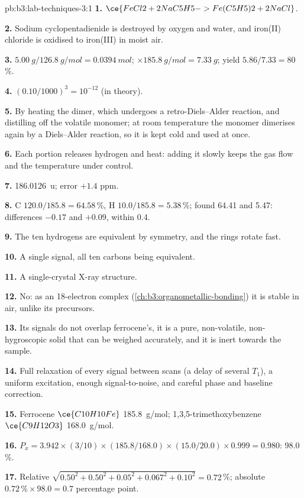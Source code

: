 \begin{solution}{pb:b3:lab-techniques-3:1}
\textbf{1.} $\ce{FeCl2 + 2NaC5H5 -> Fe(C5H5)2 + 2NaCl}$.

\textbf{2.} Sodium cyclopentadienide is destroyed by oxygen and water, and iron(II)
chloride is oxidised to iron(III) in moist air.

\textbf{3.} $\qty{5.00}{g}/\qty{126.8}{g/mol} = \qty{0.0394}{mol}$; $\times \qty{185.8}{g/mol} = \qty{7.33}{g}$; yield $5.86/7.33 = 80$\,\%.

\textbf{4.} $(0.10/1000)^3 = 10^{-12}$ (in theory).

\textbf{5.} By heating the dimer, which undergoes a retro-Diels--Alder reaction, and
distilling off the volatile monomer; at room temperature the monomer dimerises
again by a Diels--Alder reaction, so it is kept cold and used at once.

\textbf{6.} Each portion releases hydrogen and heat: adding it slowly keeps the gas
flow and the temperature under control.

\textbf{7.} \qty{186.0126}{u}; error $+1.4$ ppm.

\textbf{8.} C $120.0/185.8 = 64.58$\,\%, H $10.0/185.8 = 5.38$\,\%; found 64.41 and 5.47: differences $-0.17$ and $+0.09$, within 0.4.

\textbf{9.} The ten hydrogens are equivalent by symmetry, and the rings rotate fast.

\textbf{10.} A single signal, all ten carbons being equivalent.

\textbf{11.} A single-crystal X-ray structure.

\textbf{12.} No: as an 18-electron complex (\cref{ch:b3:organometallic-bonding}) it is stable in air, unlike its
precursors.

\textbf{13.} Its signals do not overlap ferrocene's, it is a pure, non-volatile,
non-hygroscopic solid that can be weighed accurately, and it is inert towards the
sample.

\textbf{14.} Full relaxation of every signal between scans (a delay of several $T_1$),
a uniform excitation, enough signal-to-noise, and careful phase and baseline
correction.

\textbf{15.} Ferrocene $\ce{C10H10Fe}$ \qty{185.8}{g/mol}; 1,3,5-trimethoxybenzene $\ce{C9H12O3}$ \qty{168.0}{g/mol}.

\textbf{16.} $P_x = 3.942 \times (3/10) \times (185.8/168.0) \times (15.0/20.0) \times 0.999 = 0.980$: 98.0\,\%.

\textbf{17.} Relative $\sqrt{0.50^2 + 0.50^2 + 0.05^2 + 0.067^2 + 0.10^2} = 0.72$\,\%; absolute $0.72\,\% \times 98.0 = 0.7$ percentage point.


\end{solution}
